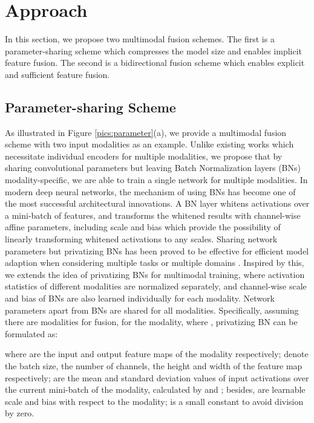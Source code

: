 \documentclass[sigconf]{acmart}
\begin{document}
\section{Approach}
In this section, we propose two multimodal fusion schemes. The first is a parameter-sharing scheme which compresses the model size and enables implicit feature fusion. The second is a bidirectional fusion scheme which enables explicit and sufficient feature fusion.
\subsection{Parameter-sharing Scheme}
\label{sec:parameter_sharing}
As illustrated in Figure \ref{pics:parameter}(a), we provide a multimodal fusion scheme with two input modalities as an example. Unlike existing works which necessitate individual encoders for multiple modalities, we propose that by sharing convolutional parameters but leaving Batch Normalization layers (BNs) \cite{DBLP:conf/icml/IoffeS15} modality-specific, we are able to train a single network for multiple modalities. 
In modern deep neural networks, the mechanism of using BNs has become one of the most successful architectural innovations. A BN layer whitens activations over a mini-batch of features, and transforms the whitened results with channel-wise affine parameters, including scale  and bias  which provide the possibility of linearly transforming whitened activations to any scales. Sharing network parameters but privatizing BNs has been proved to be effective for efficient model adaption when considering multiple tasks or multiple domains \cite{DBLP:conf/iclr/LiWS0H17,DBLP:conf/iclr/MudrakartaSZH19,DBLP:conf/iclr/YuYXYH19,wang2020rsnets}. Inspired by this, we extends the idea of privatizing BNs for multimodal training, where activation statistics of different modalities are normalized separately, and channel-wise scale and bias of BNs are also learned individually for each modality. Network parameters apart from BNs are shared for all modalities. Specifically, assuming there are  modalities for fusion, for the  modality, where , privatizing BN can be formulated as:

where  are the input and output feature maps of the  modality respectively;  denote the batch size, the number of channels, the height and width of the feature map respectively;  are the mean and standard deviation values of input activations over the current mini-batch of the  modality, calculated by  and ; besides,   are learnable scale and bias with respect to the  modality;  is a small constant to avoid division by zero.
\end{document}
